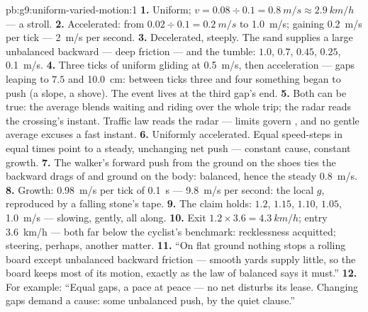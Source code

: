 \begin{solution}{pb:g9:uniform-varied-motion:1}
\textbf{1.} Uniform; $v = 0.08 \div 0.1 = \qty{0.8}{m/s}
\approx \qty{2.9}{km/h}$ --- a stroll.
\textbf{2.} Accelerated: from $0.02 \div 0.1 = \qty{0.2}{m/s}$
to \qty{1.0}{m/s}; gaining \qty{0.2}{m/s} per tick ---
\qty{2}{m/s} per second.
\textbf{3.} Decelerated, steeply. The sand supplies a large
unbalanced backward  --- deep friction --- and the
 tumble: $1.0$, $0.7$, $0.45$, $0.25$,
\qty{0.1}{m/s}.
\textbf{4.} Three ticks of uniform gliding at \qty{0.5}{m/s},
then acceleration --- gaps leaping to $7.5$ and
\qty{10.0}{cm}: between ticks three and four something began
to push (a slope, a shove). The event lives at the third
gap's end.
\textbf{5.} Both can be true: the average blends waiting and
riding over the whole trip; the radar reads the crossing's
instant. Traffic law reads the radar --- limits govern
, and no gentle average excuses a fast
instant.
\textbf{6.} Uniformly accelerated. Equal speed-steps in equal
times point to a steady, unchanging net push --- constant
cause, constant growth.
\textbf{7.} The walker's forward push from the ground on the
shoes ties the backward drags of  and ground on the body:
balanced, hence the steady \qty{0.8}{m/s}.
\textbf{8.} Growth: \qty{0.98}{m/s} per tick of \qty{0.1}{s}
--- \qty{9.8}{m/s} per second: the local $g$, reproduced by a
falling stone's tape.
\textbf{9.} The claim holds:  $1.2$, $1.15$, $1.10$,
$1.05$, \qty{1.0}{m/s} --- slowing, gently, all along.
\textbf{10.} Exit $1.2 \times 3.6 = \qty{4.3}{km/h}$; entry
\qty{3.6}{km/h} --- both far below the cyclist's benchmark:
recklessness acquitted; steering, perhaps, another matter.
\textbf{11.} ``On flat ground nothing stops a rolling board
except unbalanced backward friction --- smooth yards supply
little, so the board keeps most of its motion, exactly as
the law of balanced  says it must.''
\textbf{12.} For example: ``Equal gaps, a pace at peace ---
no net  disturbs its lease. Changing gaps demand a
cause: some unbalanced push, by the quiet clause.''
\end{solution}
